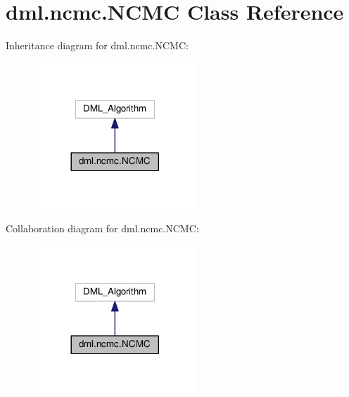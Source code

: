 \hypertarget{classdml_1_1ncmc_1_1NCMC}{}\section{dml.\+ncmc.\+N\+C\+MC Class Reference}
\label{classdml_1_1ncmc_1_1NCMC}


Inheritance diagram for dml.\+ncmc.\+N\+C\+MC\+:
\nopagebreak
\begin{figure}[H]
\begin{center}
\leavevmode
\includegraphics[width=173pt]{classdml_1_1ncmc_1_1NCMC__inherit__graph}
\end{center}
\end{figure}


Collaboration diagram for dml.\+ncmc.\+N\+C\+MC\+:
\nopagebreak
\begin{figure}[H]
\begin{center}
\leavevmode
\includegraphics[width=173pt]{classdml_1_1ncmc_1_1NCMC__coll__graph}
\end{center}
\end{figure}
